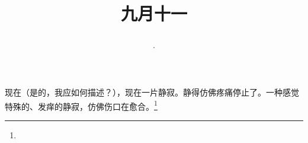 \title{\date[d=13,m=10,y=2024][year:cn-y,年,month:cn,day:cn,日,·,weekday]·九月十一 }
现在（是的，我应如何描述？），现在一片静寂。静得仿佛疼痛停止了。一种感觉特殊的、发痒的静寂，仿佛伤口在愈合。\footnote{ }

